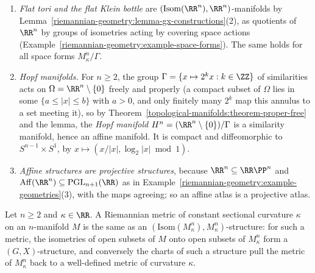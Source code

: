 \begin{example}\label{riemannian-geometry:example-gx-structures}
\begin{enumerate}
\item \emph{Flat tori and the flat Klein bottle} are $(\mathrm{Isom}(\RR^n), \RR^n)$-manifolds by Lemma~\ref{riemannian-geometry:lemma-gx-constructions}(2), as quotients of $\RR^n$ by groups of isometries acting by covering space actions
(Example~\ref{riemannian-geometry:example-space-forms}). The same holds for all space forms $M^n_\kappa/\Gamma$.
\item \emph{Hopf manifolds.} For $n \geq 2$, the group $\Gamma = \{x \mapsto 2^kx : k \in \ZZ\}$ of similarities acts on $\Omega = \RR^n \setminus \{0\}$ freely and properly (a compact subset of $\Omega$ lies in some
$\{a \leq |x| \leq b\}$ with $a > 0$, and only finitely many $2^k$ map this annulus to a set meeting it), so by Theorem~\ref{topological-manifolds:theorem-proper-free} and the lemma, the \emph{Hopf manifold}
$H^n = (\RR^n \setminus \{0\})/\Gamma$ is a similarity manifold, hence an affine manifold. It is compact and diffeomorphic to $S^{n-1} \times S^1$, by $x \mapsto (x/|x|, \log_2|x| \bmod 1)$.
\item \emph{Affine structures are projective structures}, because $\RR^n \subseteq \RR\PP^n$ and $\mathrm{Aff}(\RR^n) \subseteq \mathrm{PGL}_{n+1}(\RR)$ as in Example~\ref{riemannian-geometry:example-geometries}(3), with
the maps agreeing; so an affine atlas is a projective atlas.
\end{enumerate}
\end{example}

\begin{proposition}\label{riemannian-geometry:proposition-constant-curvature-gx}
Let $n \geq 2$ and $\kappa \in \RR$. A Riemannian metric of constant sectional curvature $\kappa$ on an $n$-manifold $M$ is the same as an $(\mathrm{Isom}(M^n_\kappa), M^n_\kappa)$-structure: for such a metric, the
isometries of open subsets of $M$ onto open subsets of $M^n_\kappa$ form a $(G, X)$-structure, and conversely the charts of such a structure pull the metric of $M^n_\kappa$ back to a well-defined metric of curvature $\kappa$.
\end{proposition}

